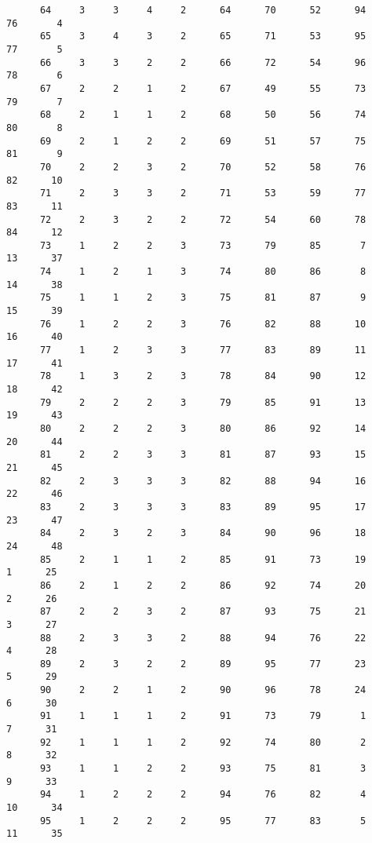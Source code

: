 \begin{verbatim}
      64     3     3     4     2      64      70      52      94      76       4 
      65     3     4     3     2      65      71      53      95      77       5 
      66     3     3     2     2      66      72      54      96      78       6 
      67     2     2     1     2      67      49      55      73      79       7 
      68     2     1     1     2      68      50      56      74      80       8 
      69     2     1     2     2      69      51      57      75      81       9 
      70     2     2     3     2      70      52      58      76      82      10 
      71     2     3     3     2      71      53      59      77      83      11 
      72     2     3     2     2      72      54      60      78      84      12 
      73     1     2     2     3      73      79      85       7      13      37
      74     1     2     1     3      74      80      86       8      14      38
      75     1     1     2     3      75      81      87       9      15      39
      76     1     2     2     3      76      82      88      10      16      40
      77     1     2     3     3      77      83      89      11      17      41
      78     1     3     2     3      78      84      90      12      18      42
      79     2     2     2     3      79      85      91      13      19      43
      80     2     2     2     3      80      86      92      14      20      44
      81     2     2     3     3      81      87      93      15      21      45
      82     2     3     3     3      82      88      94      16      22      46
      83     2     3     3     3      83      89      95      17      23      47
      84     2     3     2     3      84      90      96      18      24      48
      85     2     1     1     2      85      91      73      19       1      25
      86     2     1     2     2      86      92      74      20       2      26
      87     2     2     3     2      87      93      75      21       3      27
      88     2     3     3     2      88      94      76      22       4      28
      89     2     3     2     2      89      95      77      23       5      29
      90     2     2     1     2      90      96      78      24       6      30
      91     1     1     1     2      91      73      79       1       7      31
      92     1     1     1     2      92      74      80       2       8      32
      93     1     1     2     2      93      75      81       3       9      33
      94     1     2     2     2      94      76      82       4      10      34
      95     1     2     2     2      95      77      83       5      11      35

\end{verbatim}
